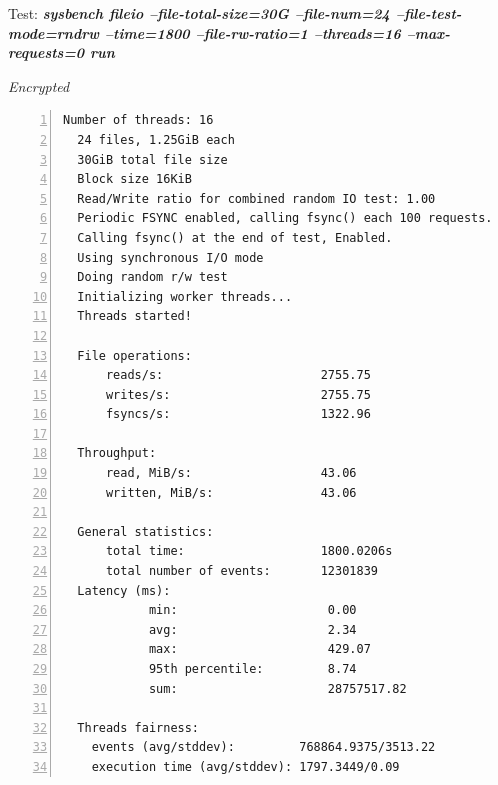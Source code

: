 \newpage
\begin{center}
  Test: \textbf{\textit{sysbench fileio --file-total-size=30G --file-num=24 --file-test-mode=rndrw --time=1800 --file-rw-ratio=1 --threads=16 --max-requests=0 run}}  
\end{center}
\vspace*{-\baselineskip}
\noindent\begin{minipage}[t]{0.45\linewidth}
  \centering
  \textit{Encrypted}
  \lstset{language=bash,label=SliceExaple}
  \begin{lstlisting}[basicstyle=\tiny,frame=single, numbers=left, label=cpu_test1]
  Number of threads: 16
  24 files, 1.25GiB each
  30GiB total file size
  Block size 16KiB
  Read/Write ratio for combined random IO test: 1.00
  Periodic FSYNC enabled, calling fsync() each 100 requests.
  Calling fsync() at the end of test, Enabled.
  Using synchronous I/O mode
  Doing random r/w test
  Initializing worker threads...
  Threads started!

  File operations:
      reads/s:                      2755.75
      writes/s:                     2755.75
      fsyncs/s:                     1322.96
  
  Throughput:
      read, MiB/s:                  43.06
      written, MiB/s:               43.06
  
  General statistics:
      total time:                   1800.0206s
      total number of events:       12301839
  Latency (ms):
            min:                     0.00
            avg:                     2.34
            max:                     429.07
            95th percentile:         8.74
            sum:                     28757517.82
  
  Threads fairness:
    events (avg/stddev):         768864.9375/3513.22
    execution time (avg/stddev): 1797.3449/0.09
  \end{lstlisting}
\end{minipage}
\hspace{0.5cm}
